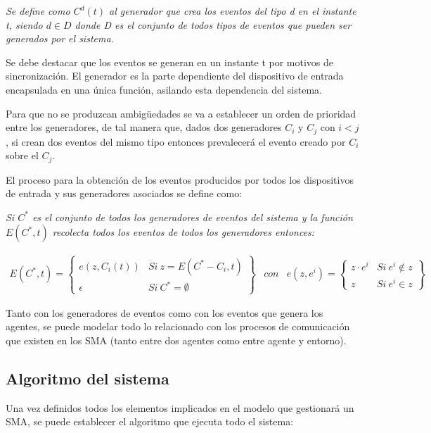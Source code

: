 \documentclass[runningheads]{llncs}
\begin{document}
	{\itshape
		Se define como $C^d(t)$ al generador que crea los eventos del tipo d en el instante t, siendo $d \in D$ donde D es el conjunto de todos tipos de eventos que pueden ser generados por el sistema.
	}

	Se debe destacar que los eventos se generan en un instante t por motivos de sincronizaci\'on. El generador es la parte dependiente del dispositivo de entrada encapsulada en una \'unica funci\'on, asilando esta dependencia del sistema.
	
	Para que no se produzcan ambig\"uedades se va a establecer un orden de prioridad entre los generadores, de tal manera que, dados dos generadores $C_i$ y $C_j$ con $i < j$, si crean dos eventos del mismo tipo entonces prevalecer\'a el evento creado por $C_i$ sobre el $C_j$. 
	
	El proceso para la obtenci\'on de los eventos producidos por todos los dispositivos de entrada y sus generadores asociados se define como:
	
	{\itshape
		Si $C^*$ es el conjunto de todos los generadores de eventos del sistema y la funci\'on $E(C^*,t)$ recolecta todos los eventos de todos los generadores entonces:
		
\begin{eqnarray*}
E(C^{*},t)=\left\{ \begin{array}{ll}
e(z,C_{i}(t)) & \mathit{Si}\ z=E(C^{*}-C_{i},t)\\
\epsilon & \mathit{Si}\ C^{*}=\emptyset\end{array}\right\}  
& 
con
& 
e(z,e^{i})=\left\{ \begin{array}{ll}
z\cdot e^{i} & \mathit{Si}\ e^{i}\notin z\\
z & \mathit{Si}\ e^{i}\in z\end{array}\right\} 
\end{eqnarray*}
}

Tanto con los generadores de eventos como con los eventos que genera los agentes, se puede modelar todo lo relacionado con los procesos de comunicaci\'on que existen en los SMA (tanto entre dos agentes como entre agente y entorno).

\subsection{Algoritmo del sistema\label{sec:Algoritmo del sistema}}

Una vez definidos todos los elementos implicados en el modelo que gestionar\'a un SMA, se puede establecer el algoritmo que ejecuta todo el sistema:
\end{document}

